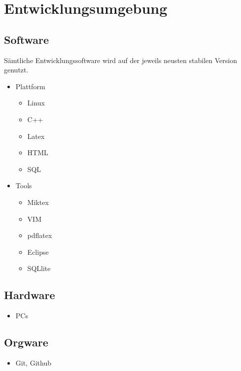 
\section{Entwicklungsumgebung}


\subsection{Software}

Sämtliche Entwicklungssoftware wird auf der jeweils neusten stabilen Version genutzt.

\begin{itemize}
	\item Plattform
		\begin{itemize}
		\item Linux
			\item C++
			\item Latex
			\item HTML
			\item SQL
		\end{itemize}
	\item Tools
		\begin{itemize}
			\item Miktex
			\item VIM
			\item pdflatex
			\item Eclipse
			\item SQLlite
		\end{itemize}

\end{itemize}

\subsection{Hardware}

\begin{itemize}
	\item PCs
\end{itemize}

\subsection{Orgware}

\begin{itemize}
	\item Git, Github
\end{itemize}
